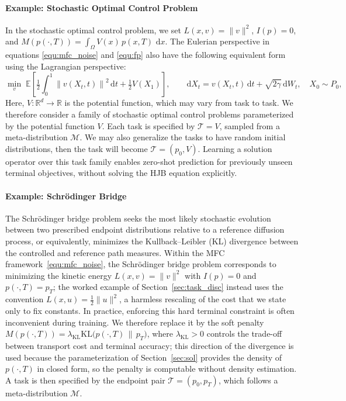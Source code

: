 \documentclass[preprint]{elsarticle}
\newcommand{\rd}{\mathrm{d}}
\newcommand{\dd}{\,\mathrm{d}}          %
\newcommand{\norm}[1]{\left\|#1\right\|}
\newcommand{\E}{\mathbb{E}}
\newcommand{\g}{\gamma}
\begin{document}
\paragraph{Example: Stochastic Optimal Control Problem}
In the stochastic optimal control problem, we set $L(x,v)=\|v\|^2$, $I(p)=0$, and $M(p(\cdot,T)) = \int_{\Omega} V(x)\,p(x,T)\,\dd x$. The Eulerian perspective in equations \eqref{equ:mfc_noise} and \eqref{equ:fp} also have the following equivalent form using the Lagrangian perspective: 
\begin{equation}
\min_v\;
\E\left[\tfrac12\int_0^1\norm{v(X_t,t)}^2\dd t+\tfrac12 V(X_1)\right],
\qquad
\rd X_t=v(X_t,t)\,\rd t+\sqrt{2\g}\,\rd W_t,
\quad X_0\sim P_0,
\end{equation}
Here, $V:\mathbb R^d\to\mathbb R$ is the potential function, which may vary from task to task. We therefore consider a family of stochastic optimal control problems parameterized by the potential function $V$. Each task is specified by $\mathcal T = V$,  sampled from a meta-distribution $\mathcal M$. We may also generalize the tasks to have random initial distributions, then the task will become $\mathcal T = (p_0,V)$.  Learning a solution operator over this task family enables zero-shot prediction for previously unseen terminal objectives, without solving the HJB equation explicitly.

\paragraph{Example: Schr\"odinger Bridge}
The Schr\"odinger bridge problem seeks the most likely stochastic evolution between two prescribed endpoint distributions relative to a reference diffusion process, or equivalently, minimizes the Kullback--Leibler (KL) divergence between the controlled and reference path measures. Within the MFC framework~\eqref{equ:mfc_noise}, the Schr\"odinger bridge problem corresponds to minimizing the kinetic energy $L(x,v)=\|v\|^2$ with $I(p)=0$ and $p(\cdot,T)=p_T$; the worked example of Section~\ref{sec:task_disc} instead uses the convention $L(x,u)=\frac12\|u\|^2$, a harmless rescaling of the cost that we state only to fix constants. In practice, enforcing this hard terminal constraint is often inconvenient during training. We therefore replace it by the soft penalty $M(p(\cdot,T)) = \lambda_{\mathrm{KL}} \mathrm{KL}\bigl(p(\cdot,T)\,\|\,p_T\bigr)$, where $\lambda_{\mathrm{KL}}>0$ controls the trade-off between transport cost and terminal accuracy; this direction of the divergence is used because the parameterization of Section~\ref{sec:sol} provides the density of $p(\cdot,T)$ in closed form, so the penalty is computable without density estimation. A task is then specified by the endpoint pair $\mathcal T=(p_0,p_T)$, which follows a meta-distribution $\mathcal M$.
\end{document}
